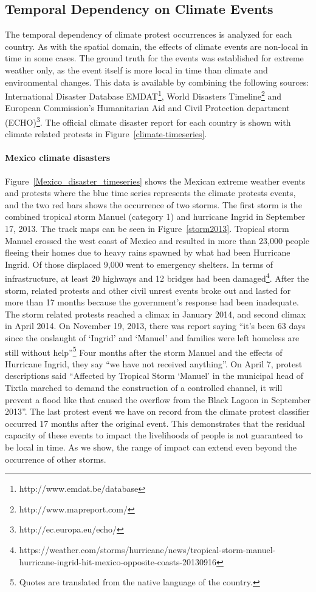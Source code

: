 \documentclass[9pt,twocolumn,twoside]{pnas-new}
\begin{document}
\subsection{Temporal Dependency on Climate Events}
The temporal dependency of climate protest occurrences is analyzed for each country.
As with the spatial domain, the effects of climate events are non-local in time in some cases.
The ground truth for the events was established for extreme weather only, as the event itself is more local in time than climate and environmental changes.
This data is available by combining the following sources: International Disaster Database EMDAT\footnote{http://www.emdat.be/database}, World Disasters Timeline\footnote{http://www.mapreport.com/} and European Commission's Humanitarian Aid and Civil Protection department (ECHO)\footnote{http://ec.europa.eu/echo/}.
The official climate disaster report for each country is shown with climate related protests in Figure~\ref{climate-timeseries}.


\paragraph{Mexico climate disasters}
Figure~\ref{Mexico_disaster_timeseries} shows the Mexican extreme weather events and protests where the blue time series represents the climate protests events, and the two red bars shows the occurrence of two storms.
The first storm is the combined tropical storm Manuel (category 1) and hurricane Ingrid in September 17, 2013.
The track maps can be seen in Figure~\ref{storm2013}.
Tropical storm Manuel crossed the west coast of Mexico and resulted in more than 23,000 people fleeing their homes due to heavy rains spawned by what had been Hurricane Ingrid.
Of those displaced 9,000 went to emergency shelters.
In terms of infrastructure, at least 20 highways and 12 bridges had been damaged\footnote{https://weather.com/storms/hurricane/news/tropical-storm-manuel-hurricane-ingrid-hit-mexico-opposite-coasts-20130916}.
After the storm, related protests and other civil unrest events broke out and lasted for more than 17 months because the government's response had been inadequate.
The storm related protests reached a climax in January 2014, and second climax in April 2014.
On November 19, 2013, there was report saying ``it's been 63 days since the onslaught of `Ingrid' and `Manuel' and families were left homeless are still without help''\footnote{Quotes are translated from the native language of the country.}
Four months after the storm Manuel and the effects of Hurricane Ingrid, they say ``we have not received anything''.
On April 7, protest descriptions said ``Affected by Tropical Storm `Manuel' in the municipal head of Tixtla marched to demand the construction of a controlled channel, it will prevent a flood like that caused the overflow from the Black Lagoon in September 2013''.
The last protest event we have on record from the climate protest classifier occurred 17 months after the original event.
This demonstrates that the residual capacity of these events to impact the livelihoods of people is not guaranteed to be local in time.
As we show, the range of impact can extend even beyond the occurrence of other storms.
\end{document}
